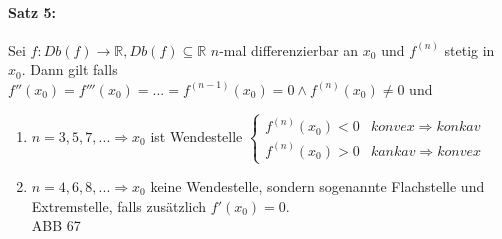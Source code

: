 \paragraph{Satz 5:} Sei $f: Db(f) \to \mathbb{R}, Db(f) \subseteq \mathbb{R}$ $n$-mal differenzierbar an $x_0$ und $f^{(n)}$ stetig in $x_0$. Dann gilt falls $f''(x_0)=f'''(x_0)=...=f^{(n-1)}(x_0)=0 \wedge f^{(n)}(x_0)\not = 0$ und
\begin{enumerate}[label=\alph*.)]
\item $n=3,5,7,... \Rightarrow x_0$ ist Wendestelle $\begin{cases}
f^{(n)}(x_0)<0 & konvex \Rightarrow konkav\\
f^{(n)}(x_0)>0 & kankav \Rightarrow konvex
\end{cases}$
\item $n=4,6,8,... \Rightarrow x_0$ keine Wendestelle, sondern sogenannte Flachstelle und Extremstelle, falls zusätzlich $f'(x_0) = 0$.\\
ABB 67
\end{enumerate}





















